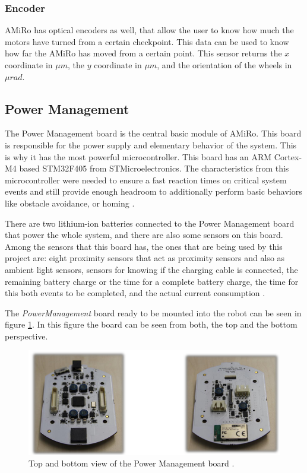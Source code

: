 \documentclass[12pt]{report}%
\begin{document}
\subsubsection{Encoder}
AMiRo has optical encoders as well, that allow the user to know how much the motors have turned from a certain checkpoint. This data can be used to know how far the AMiRo has moved from a certain point. This sensor returns the $x$ coordinate in $\mu m$, the $y$ coordinate in $\mu m$, and the orientation of the wheels in $\mu rad$.

\subsection{Power Management}
\label{PWB}
The Power Management board is the central basic module of AMiRo. This board is responsible for the power supply and elementary behavior of the system. This is why it has the most powerful microcontroller. This board has an ARM Cortex-M4 based STM32F405 from STMicroelectronics. The characteristics from this microcontroller were needed to ensure a fast reaction times on critical system events and still provide enough headroom to additionally perform basic behaviors like obstacle avoidance, or homing \cite{AMiRo_paper_modular}.

There are two lithium-ion batteries connected to the Power Management board that power the whole system, and there are also some sensors on this board. Among the sensors that this board has, the ones that are being used by this project are: eight proximity sensors that act as proximity sensors and also as ambient light sensors, sensors for knowing if the charging cable is connected, the remaining battery charge or the time for a complete battery charge, the time for this both events to be completed, and the actual current consumption  \cite{AMiRo_paper_modular}.

The \textit{PowerManagement} board ready to be mounted into the robot can be seen in figure \ref{fig:powerm}. In this figure the board can be seen from both, the top and the bottom perspective.

\begin{figure}[ht]
	\centering
	\includegraphics[width=\textwidth]{power_real}
    \caption{Top and bottom view of the Power Management board \cite{AMiRo_ppt_v1}.}
    \label{fig:powerm}
\end{figure}
\clearpage
\end{document}
